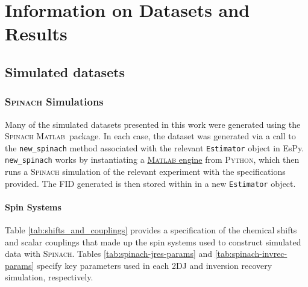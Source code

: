 \chapter{Information on Datasets and Results}
\label{chap:datasets}

\section{Simulated datasets}
\label{sec:simulated-datasets}

\subsection{\textsc{\textsc{Spinach}} Simulations}
Many of the simulated datasets presented in this work were generated using the
\textsc{Spinach} \textsc{Matlab}\textregistered\ package\cite{Hogben2011}.
In each case, the dataset was generated via a call to the \texttt{new\_spinach}
method associated with the relevant \texttt{Estimator} object in \ac{EsPy}.
\texttt{new\_spinach} works by instantiating a \href{https://www.mathworks.com/help/matlab/matlab-engine-for-python.html}{\textsc{Matlab}
engine} from \textsc{Python}, which then runs a \textsc{\textsc{Spinach}} simulation of the relevant
experiment with the specifications provided. The \ac{FID} generated is then
stored within in a new \texttt{Estimator} object.

\subsubsection{Spin Systems}
Table \ref{tab:shifts_and_couplings} provides a specification of the chemical
shifts and scalar couplings that made up the spin systems used to construct
simulated data with \textsc{Spinach}. Tables \ref{tab:spinach-jres-params} and
\ref{tab:spinach-invrec-params} specify key parameters used in each
\ac{2DJ} and inversion recovery simulation, respectively.
